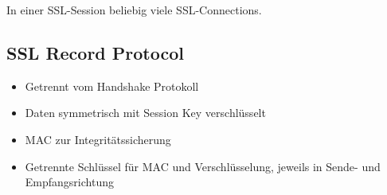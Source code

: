 In einer SSL-Session beliebig viele SSL-Connections.

\subsection{SSL Record Protocol}
\begin{itemize}
    \item Getrennt vom Handshake Protokoll
    \item Daten symmetrisch mit Session Key verschlüsselt
    \item MAC zur Integritätssicherung
    \item Getrennte Schlüssel für MAC und Verschlüsselung, jeweils in Sende- und
        Empfangsrichtung
\end{itemize}
